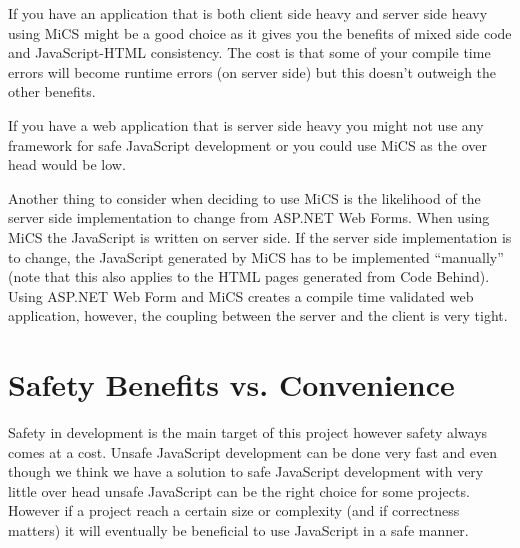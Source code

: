 	If you have an application that is both client side heavy and server side heavy using MiCS might be a good choice as it gives you the benefits of mixed side code and JavaScript-HTML consistency. The cost is that some of your compile time errors will become runtime errors (on server side) but this doesn't outweigh the other benefits. 

	If you have a web application that is server side heavy you might not use any framework for safe JavaScript development or you could use MiCS as the over head would be low.

	Another thing to consider when deciding to use MiCS is the likelihood of the server side implementation to change from ASP.NET Web Forms. When using MiCS the JavaScript is written on server side. If the server side implementation is to change, the JavaScript generated by MiCS has to be implemented ``manually'' (note that this also applies to the HTML pages generated from Code Behind). Using ASP.NET Web Form and MiCS creates a compile time validated web application, however, the coupling between the server and the client is very tight.



\section{Safety Benefits vs. Convenience} %
\label{sec:safety_benefits_vs_conveniente}
	Safety in development is the main target of this project however safety always comes at a cost. Unsafe JavaScript development can be done very fast and even though we think we have a solution to safe JavaScript development with very little over head unsafe JavaScript can be the right choice for some projects. However if a project reach a certain size or complexity (and if correctness matters) it will eventually be beneficial to use JavaScript in a safe manner.


